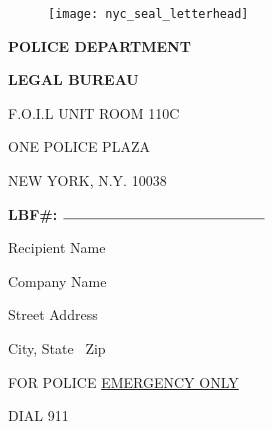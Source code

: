 \documentclass{letter}
\begin{document}
    \large{
    \begin{wrapfigure}{l}{0.25\textwidth}
        \texttt{[image: nyc\_seal\_letterhead]}
    \end{wrapfigure}

    \textbf{}

    \textbf{\LARGE POLICE DEPARTMENT}

    \textbf{LEGAL BUREAU}

    F.O.I.L UNIT  ROOM 110C

    ONE POLICE PLAZA

    NEW YORK, N.Y. 10038

    \textbf{}

    \textbf{}

    \textbf{LBF\#:  $\rule{2in}{0.15mm}$}

    \textbf{}
    }

    \vspace{.25in}
    \large {
    \setlength\parindent{4.5in}

    Recipient Name

    Company Name

    Street Address

    City, State \ Zip
    }
    \vfill {
    FOR POLICE \underline{EMERGENCY ONLY}

    \setlength\parindent{1.1in}DIAL 911
    }
\end{document}
